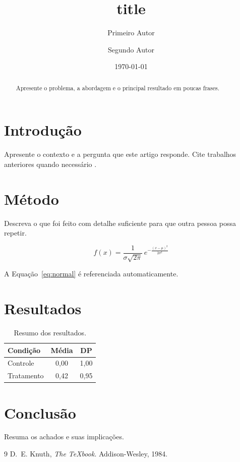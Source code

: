 \documentclass[11pt,a4paper]{article}
\title{{{title}}}
\author{Primeiro Autor \and Segundo Autor}
\date{\today}
\begin{document}
\maketitle

\begin{abstract}
Apresente o problema, a abordagem e o principal resultado em poucas frases.
\end{abstract}

\section{Introdução}

Apresente o contexto e a pergunta que este artigo responde. Cite trabalhos anteriores quando necessário \cite{knuth1984}.

\section{Método}

Descreva o que foi feito com detalhe suficiente para que outra pessoa possa repetir.

\begin{equation}
    f(x) = \frac{1}{\sigma\sqrt{2\pi}} \, e^{-\frac{(x-\mu)^2}{2\sigma^2}}
    \label{eq:normal}
\end{equation}

A Equação~\eqref{eq:normal} é referenciada automaticamente.

\section{Resultados}

\begin{table}[h]
    \centering
    \begin{tabular}{@{}lcc@{}}
        \toprule
        \textbf{Condição} & \textbf{Média} & \textbf{DP} \\
        \midrule
        Controle   & 0,00 & 1,00 \\
        Tratamento & 0,42 & 0,95 \\
        \bottomrule
    \end{tabular}
    \caption{Resumo dos resultados.}
    \label{tab:results}
\end{table}

\section{Conclusão}

Resuma os achados e suas implicações.

\begin{thebibliography}{9}
    D.~E. Knuth, \emph{The \TeX book}. Addison-Wesley, 1984.
\end{thebibliography}
\end{document}
